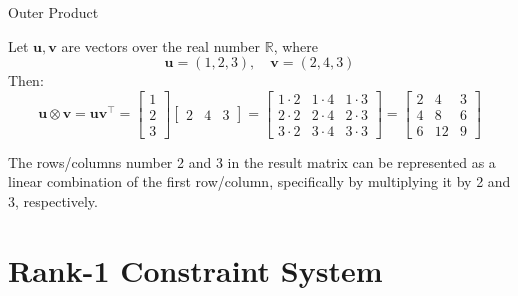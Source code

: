 \documentclass{zkdl-presentation-template}
\begin{document}
    \begin{frame}{Outer Product}
        \begin{example}
            Let $\mathbf{u}, \mathbf{v}$ are vectors over the real number $\mathbb{R}$, where
            \begin{equation*}
                \mathbf{u} = (1, 2, 3), \quad \mathbf{v} = (2, 4, 3)
            \end{equation*}
            Then: 
            \begin{equation*}
                \mathbf{u} \otimes \mathbf{v} = \mathbf{u}\mathbf{v}^{\top} = \begin{bmatrix}
                1 \\ 2 \\ 3
                \end{bmatrix}\begin{bmatrix}
                2 & 4 & 3
                \end{bmatrix} = \begin{bmatrix}
                    1 \cdot 2 & 1 \cdot 4 & 1 \cdot 3 \\
                    2 \cdot 2 & 2 \cdot 4 & 2 \cdot 3 \\
                    3 \cdot 2 & 3 \cdot 4 & 3 \cdot 3
                \end{bmatrix} = \begin{bmatrix}
                    2 & 4 & 3 \\
                    4 & 8 & 6 \\
                    6 & 12 & 9
                \end{bmatrix}
            \end{equation*}

            \pause
            The rows/columns number 2 and 3 in the result matrix can be represented as a linear 
            combination of the first row/column, specifically by multiplying it by 2 and 3, 
            respectively. 
        \end{example}
    \end{frame}

    \section{Rank-1 Constraint System}
\end{document}
